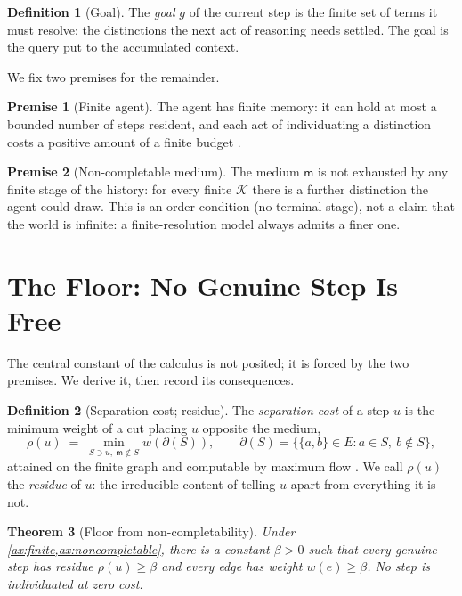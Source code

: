 \documentclass[11pt,a4paper]{article}
\theoremstyle{thmstyle}
\newtheorem{theorem}{Theorem}[section]
\theoremstyle{definition}
\newtheorem{definition}[theorem]{Definition}
\newtheorem{axiom}{Premise}
\theoremstyle{remark}
\newcommand{\Ctx}{\mathcal{K}}          %
\newcommand{\Edg}{E}
\newcommand{\wt}{w}
\newcommand{\med}{\mathsf{m}}           %
\newcommand{\flo}{\beta}                %
\newcommand{\cut}{\partial}
\newcommand{\res}{\rho}                 %
\newcommand{\goal}{g}                   %
\newcommand{\set}[1]{\{#1\}}
\begin{document}
\begin{definition}[Goal]
\label{def:goal}
The \emph{goal} $\goal$ of the current step is the finite set of terms it must
resolve: the distinctions the next act of reasoning needs settled. The goal is
the query put to the accumulated context.
\end{definition}

We fix two premises for the remainder.

\begin{axiom}[Finite agent]
\label{ax:finite}
The agent has finite memory: it can hold at most a bounded number of steps
resident, and each act of individuating a distinction costs a positive amount of
a finite budget \citep{simon1955,simon1956}.
\end{axiom}

\begin{axiom}[Non-completable medium]
\label{ax:noncompletable}
The medium $\med$ is not exhausted by any finite stage of the history: for every
finite $\Ctx$ there is a further distinction the agent could draw. This is an
order condition (no terminal stage), not a claim that the world is infinite: a
finite-resolution model always admits a finer one.
\end{axiom}

\section{The Floor: No Genuine Step Is Free}
\label{sec:floor}

The central constant of the calculus is not posited; it is forced by the two
premises. We derive it, then record its consequences.

\begin{definition}[Separation cost; residue]
\label{def:residue}
The \emph{separation cost} of a step $u$ is the minimum weight of a cut placing
$u$ opposite the medium,
\[
\res(u)\;=\;\min_{S\ni u,\ \med\notin S}\wt(\cut(S)),
\qquad
\cut(S)=\set{\set{a,b}\in\Edg : a\in S,\ b\notin S},
\]
attained on the finite graph and computable by maximum flow
\citep{fordfulkerson1956,menger1927}. We call $\res(u)$ the \emph{residue} of
$u$: the irreducible content of telling $u$ apart from everything it is not.
\end{definition}

\begin{theorem}[Floor from non-completability]
\label{thm:floor}
Under \cref{ax:finite,ax:noncompletable}, there is a constant $\flo>0$ such that
every genuine step has residue $\res(u)\ge\flo$ and every edge has weight
$\wt(e)\ge\flo$. No step is individuated at zero cost.
\end{theorem}
\end{document}
